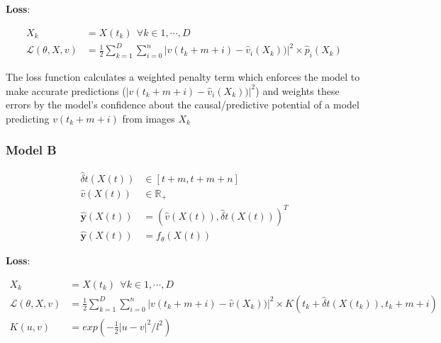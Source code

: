 \documentclass[]{article}
\theoremstyle{definition}
\begin{document}
\textbf{Loss}: 

\begin{align*}
    X_{k}                     & = { X(t_{k}) } \ \ \forall k \in {1, \cdots, D} \\
    \mathcal{L}(\theta, X, v) & = \frac{1}{2} \sum_{k = 1}^{D}{\sum_{i = 0}^{n}{|v(t_{k}+m+i) - \hat{v}_{i}(X_k))|^{2} \times \hat{p}_{i}(X_{k})}}
\end{align*}

The loss function calculates a weighted penalty term which enforces the model to make accurate predictions ($|v(t_{k}+m+i) - \hat{v}_{i}(X_k))|^{2}$) and weights these errors by the model's confidence about the causal/predictive potential of a model predicting $v(t_{k}+m+i)$ from images $X_k$

\subsubsection*{Model B}

\begin{align*}
    \hat{\delta}t(X(t))    & \in [t+m, t+m+n] \\ 
    \hat{v}(X(t))          & \in \mathbb{R}_{+}\\
    \mathbf{\hat{y}}(X(t)) & =   (\hat{v}(X(t)), \hat{\delta}t(X(t)))^T\\
    \mathbf{\hat{y}}(X(t)) & =   f_{\theta}(X(t))
\end{align*}

\textbf{Loss}:

\begin{align*}
    X_{k}                     & = { X(t_{k}) } \ \ \forall k \in {1, \cdots, D} \\
    \mathcal{L}(\theta, X, v) & = \frac{1}{2} \sum_{k = 1}^{D}{\sum_{i = 0}^{n}{|v(t_{k}+m+i) - \hat{v}(X_k))|^{2} \times K(t_{k} + \hat{\delta}t(X(t_k)), t_{k}+m+i) }} \\
    K(u, v)                   & = exp(-\frac{1}{2}|u-v|^{2}/l^2) 
\end{align*}
\end{document}

